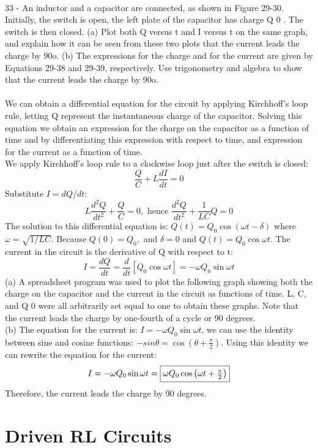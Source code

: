 \documentclass{report}
\begin{document}
\paragraph{}
33 - An inductor and a capacitor are connected, as shown in Figure 29-30. Initially, the switch is open, the left plate of the capacitor has charge Q 0 . The switch is then closed. (a) Plot both Q versus t and I versus t on the same graph, and explain how it can be seen from these two plots that the current leads the charge by 90o. (b) The expressions for the charge and for the current are given by Equations 29-38 and 29-39, respectively. Use trigonometry and algebra to show that the current leads the charge by 90o.\\
\\
We can obtain a differential equation for the circuit by applying Kirchhoff's loop rule, letting Q represent the instantaneous charge of the capacitor. Solving this equation we obtain an expression for the charge on the capacitor as a function of time and by differentiating this expression with respect to time, and expression for the current as a function of time.\\
We apply Kirchhoff's loop rule to a clockwise loop just after the switch is closed:
$$\frac{Q}{C} + L\frac{dI}{dt} = 0$$
Substitute $I = dQ/dt$:
$$L\frac{d^2Q}{dt^2} + \frac{Q}{C} = 0, \text{ hence } \frac{d^2Q}{dt^2} + \frac{1}{LC}Q = 0$$
The solution to this differential equation is: $Q(t) = Q_0\cos (\omega t - \delta)$ where $\omega = \sqrt{1 / LC}$. Because $Q(0) = Q_0,$ and $\delta = 0$ and $Q(t) = Q_0\cos \omega t$. The current in the circuit is the derivative of Q with respect to t:
$$I = \frac{dQ}{dt} = \frac{d}{dt}[Q_0 \cos \omega t] = -\omega Q_0 \sin \omega t$$
(a) A spreadsheet program was used to plot the following graph showing both the charge on the capacitor and the current in the circuit as functions of time. L, C, and Q 0 were all arbitrarily set equal to one to obtain these graphs. Note that the current leads the charge by one-fourth of a cycle or 90 degrees.\\
(b) The equation for the current is: $I = -\omega Q_0 \sin \omega t$, we can use the identity between sine and cosine functions: $-sin \theta = \cos \left( \theta + \frac{\pi}{2}\right)$. Using this identity we can rewrite the equation for the current:
$$I = -\omega Q_0 \sin \omega t = \fbox{$\omega Q_0 \cos \left( \omega t + \frac{\pi}{2}\right)$}$$
Therefore, the current leads the charge by 90 degrees.

\section{Driven RL Circuits}
\end{document}
